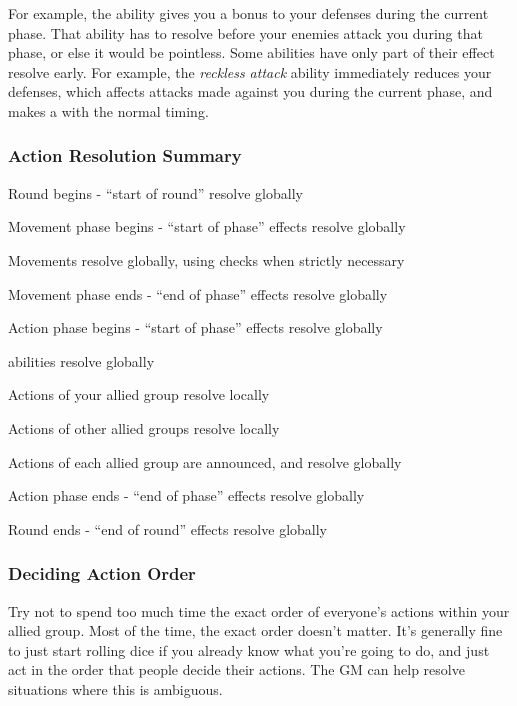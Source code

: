             For example, the  ability gives you a bonus to your defenses during the current phase.
            That ability has to resolve before your enemies attack you during that phase, or else it would be pointless.
            Some abilities have only part of their effect resolve early.
            For example, the \textit{reckless attack} ability immediately reduces your defenses, which affects attacks made against you during the current phase, and makes a  with the normal timing.

        \subsubsection{Action Resolution Summary} 
            \begin{enumerate*}
                \item Round begins - ``start of round'' resolve globally
                \item Movement phase begins - ``start of phase'' effects resolve globally
                \item Movements resolve globally, using  checks when strictly necessary
                \item Movement phase ends - ``end of phase'' effects resolve globally
                \item Action phase begins - ``start of phase'' effects resolve globally
                \item {} abilities resolve globally
                \item Actions of your allied group resolve locally
                \item Actions of other allied groups resolve locally
                \item Actions of each allied group are announced, and resolve globally
                \item Action phase ends - ``end of phase'' effects resolve globally
                \item Round ends - ``end of round'' effects resolve globally
            \end{enumerate*}

        \subsubsection{Deciding Action Order}\label{Deciding Action Order}
            Try not to spend too much time the exact order of everyone's actions within your allied group.
            Most of the time, the exact order doesn't matter.
            It's generally fine to just start rolling dice if you already know what you're going to do, and just act in the order that people decide their actions.
            The GM can help resolve situations where this is ambiguous.

